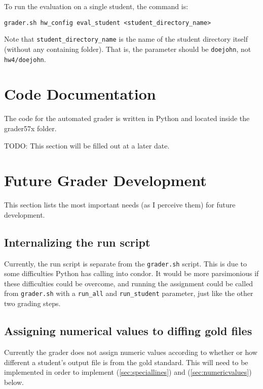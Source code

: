 \documentclass[12pt]{article}
\begin{document}
To run the evaluation on a single student, the command is:

\vspace{5pt}

\noindent \texttt{grader.sh hw\_config eval\_student <student\_directory\_name>}

\vspace{5pt}

Note that \texttt{student\_directory\_name} is the name of the student directory itself (without any containing folder). That is, the parameter should be \texttt{doejohn}, not \texttt{hw4/doejohn}.

\section{Code Documentation} \label{sec:documentation}

The code for the automated grader is written in Python and located inside the grader57x folder.

TODO: This section will be filled out at a later date.

\section{Future Grader Development} \label{sec:future}

This section lists the most important needs (as I perceive them) for future development.

\subsection{Internalizing the run script} \label{sec:internalrun}

Currently, the run script is separate from the \texttt{grader.sh} script. This is due to some difficulties Python has calling into condor. It would be more parsimonious if these difficulties could be overcome, and running the assignment could be called from \texttt{grader.sh} with a \texttt{run\_all} and \texttt{run\_student} parameter, just like the other two grading steps.

\subsection{Assigning numerical values to diffing gold files} \label{sec:assignnumbers}

Currently the grader does not assign numeric values according to whether or how different a student's output file is from the gold standard. This will need to be implemented in order to implement (\ref{sec:speciallines}) and (\ref{sec:numericvalues}) below.
\end{document}
